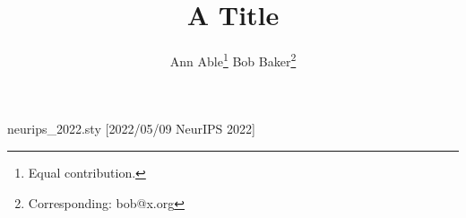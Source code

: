 \begin{filecontents*}[overwrite]{neurips_2022.sty}
[2022/05/09 NeurIPS 2022]
\providecommand{\maketitle}{}
\renewcommand{\maketitle}{%
  \let\maketitle\relax
  \let\thanks\relax
}
\providecommand{\And}{}
\renewcommand{\And}{\end{tabular}\hfil\linebreak[0]\hfil\begin{tabular}[t]{c}\ignorespaces}
\end{filecontents*}
\documentclass{article}
\usepackage{neurips_2022}
\title{A Title}
\author{Ann Able\thanks{Equal contribution.} \And Bob Baker\thanks{Corresponding: bob@x.org}}

\maketitle
Body.

